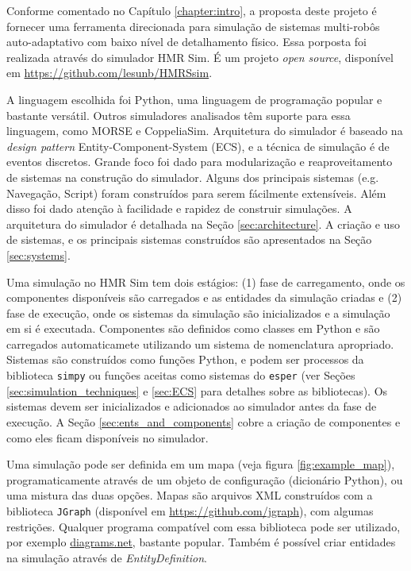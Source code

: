 \label{chapter:hmr_sim}

Conforme comentado no Capítulo \ref{chapter:intro}, a proposta deste projeto é fornecer uma ferramenta direcionada para simulação de sistemas multi-robôs auto-adaptativo com baixo nível de detalhamento físico. Essa porposta foi realizada através do simulador HMR Sim. É um projeto \textit{open source}, disponível em \url{https://github.com/lesunb/HMRSsim}.

A linguagem escolhida foi Python, uma linguagem de programação popular e bastante versátil. Outros simuladores analisados têm suporte para essa linguagem, como MORSE e CoppeliaSim. Arquitetura do simulador é baseado na \textit{design pattern} Entity-Component-System (ECS), e a técnica de simulação é de eventos discretos. Grande foco foi dado para modularização e reaproveitamento de sistemas na construção do simulador. Alguns dos principais sistemas (e.g. Navegação, Script) foram construídos para serem fácilmente extensíveis. Além disso foi dado atenção à facilidade e rapidez de construir simulações. A arquitetura do simulador é detalhada na Seção \ref{sec:architecture}. A criação e uso de sistemas, e os principais sistemas construídos são apresentados na Seção \ref{sec:systems}.

Uma simulação no HMR Sim tem dois estágios: (1) fase de carregamento, onde os componentes disponíveis são carregados e as entidades da simulação criadas e (2) fase de execução, onde os sistemas da simulação são inicializados e a simulação em si é executada. Componentes são definidos como classes em Python e são carregados automaticamete utilizando um sistema de nomenclatura apropriado. Sistemas são construídos como funções Python, e podem ser processos da biblioteca \texttt{simpy} ou funções aceitas como sistemas do \texttt{esper} (ver Seções \ref{sec:simulation_techniques} e \ref{sec:ECS} para detalhes sobre as bibliotecas). Os sistemas devem ser inicializados e adicionados ao simulador antes da fase de execução. A Seção \ref{sec:ents_and_components} cobre a criação de componentes e como eles ficam disponíveis no simulador.

Uma simulação pode ser definida em um mapa (veja figura \ref{fig:example_map}), programaticamente através de um objeto de configuração (dicionário Python), ou uma mistura das duas opções. Mapas são arquivos XML construídos com a biblioteca \texttt{JGraph} (disponível em \url{https://github.com/jgraph}), com algumas restrições. Qualquer programa compatível com essa biblioteca pode ser utilizado, por exemplo \url{diagrams.net}, bastante popular. Também é possível criar entidades na simulação através de \textit{EntityDefinition}.

